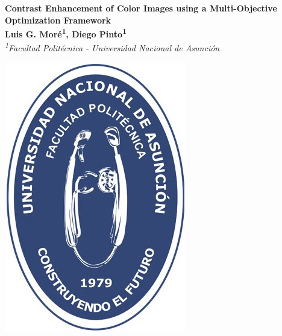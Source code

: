 \documentclass[a0,portrait,spanish,20pt]{a0poster}
\begin{document}

 
\begin{minipage}[b]{1\linewidth}
\begin{minipage}{0.60\linewidth}
\begin{shaded}
\centering
\Huge \color{White}  \textbf{Contrast Enhancement of Color Images
using a Multi-Objective Optimization
Framework}\\ [0.5cm]%
\Large \textbf{Luis G. Moré\textsuperscript{1}, Diego Pinto\textsuperscript{1}} \\ 
\Large \textit{\textsuperscript{1}Facultad Politécnica - Universidad Nacional de Asunción}
\end{shaded}
\end{minipage}
\hspace*{1cm}
\begin{minipage}{0.15\linewidth}
\includegraphics[width=1\columnwidth]{figures/photo.jpg}

\end{minipage}
\end{minipage}
\end{document}
